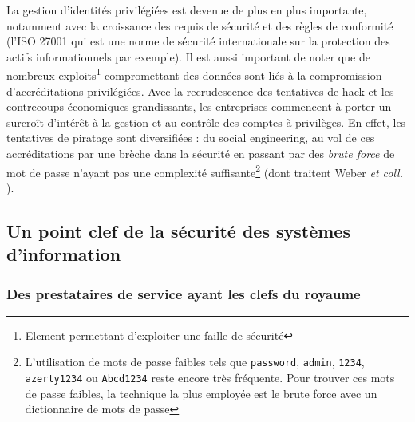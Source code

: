 La gestion d’identités privilégiées est devenue de plus en plus importante, notamment avec la croissance des requis de sécurité et des règles de conformité (l’ISO 27001 qui est une norme de sécurité internationale sur la protection des actifs informationnels par exemple). Il est aussi important de noter que de nombreux exploits\footnote{Element permettant d'exploiter une faille de sécurité} compromettant des données sont liés à la compromission d’accréditations privilégiées. Avec la recrudescence des tentatives de hack et les contrecoups économiques grandissants, les entreprises commencent à porter un surcroît d’intérêt à la gestion et au contrôle des comptes à privilèges. En effet, les tentatives de piratage sont diversifiées : du social engineering, au vol de ces accréditations par une brèche dans la sécurité en passant par des \textit{brute force} de mot de passe n’ayant pas une complexité suffisante\footnote{L'utilisation de mots de passe faibles tels que \texttt{password}, \texttt{admin}, \texttt{1234}, \texttt{azerty1234} ou \texttt{Abcd1234} reste encore très fréquente. Pour trouver ces mots de passe faibles, la technique la plus employée est le brute force avec un dictionnaire de mots de passe} (dont traitent Weber \emph{et coll.} \cite{jew}).\\

\subsection{Un point clef de la sécurité des systèmes d'information}

\subsubsection{Des prestataires de service ayant les clefs du royaume}
\label{par:presta_kingdom}

